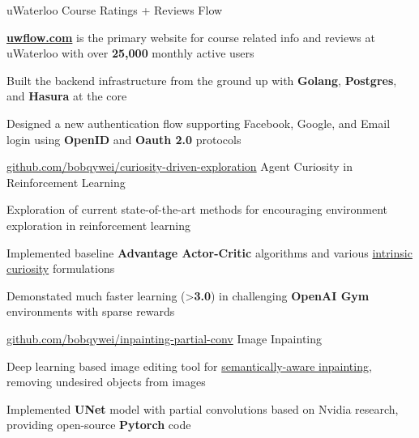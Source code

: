 
\begin{cventries}
  \cventry
    {uWaterloo Course Ratings + Reviews} %
    {Flow} %
    {} %
    {} %
    {
      \begin{cvitems} %
        \item {\href{https://uwflow.com}{\textbf{uwflow.com}} is the primary website for course related info and reviews at uWaterloo with over \textbf{25,000} monthly active users}
        \item {Built the backend infrastructure from the ground up with \textbf{Golang}, \textbf{Postgres}, and \textbf{Hasura} at the core}
        \item {Designed a new authentication flow supporting Facebook, Google, and Email login using \textbf{OpenID} and \textbf{Oauth 2.0} protocols}
      \end{cvitems}
    }

  \cventry
    {\href{https://github.com/bobqywei/curiosity-driven-exploration}{github.com/bobqywei/curiosity-driven-exploration}} %
    {Agent Curiosity in Reinforcement Learning} %
    {} %
    {} %
    {
      \begin{cvitems} %
      	\item {Exploration of current state-of-the-art methods for encouraging environment exploration in reinforcement learning}
      	\item {Implemented baseline \textbf{Advantage Actor-Critic} algorithms and various \underline{intrinsic curiosity} formulations}
      	\item {Demonstated much faster learning (>\textbf{3.0\times}) in challenging \textbf{OpenAI Gym} environments with sparse rewards}
      \end{cvitems}
    }

  \cventry
    {\href{https://github.com/bobqywei/inpainting-partial-conv}{github.com/bobqywei/inpainting-partial-conv}} %
    {Image Inpainting} %
    {} %
    {} %
    {
      \begin{cvitems} %
        \item {Deep learning based image editing tool for \underline{semantically-aware inpainting}, removing undesired objects from images}
        \item {Implemented \textbf{UNet} model with partial convolutions based on Nvidia research, providing open-source \textbf{Pytorch} code}
      \end{cvitems}
    }
\end{cventries}